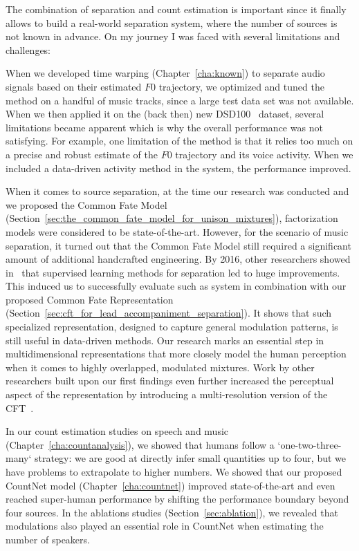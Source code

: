 The combination of separation and count estimation is important since it finally allows to build a real-world separation system, where the number of sources is not known in advance.
On my journey I was faced with several limitations and challenges:
\par
When we developed time warping (Chapter~\ref{cha:known}) to separate audio signals based on their estimated \(F0\) trajectory, we optimized and tuned the method on a handful of music tracks, since a large test data set was not available. When we then applied it on the (back then) new DSD100~\cite{liutkus17} dataset, several limitations became apparent which is why the overall performance was not satisfying. For example, one limitation of the method is that it relies too much on a precise and robust estimate of the \(F0\) trajectory and its voice activity. When we included a data-driven activity method in the system, the performance improved.
\par
When it comes to source separation, at the time our research was conducted and we proposed the Common Fate Model (Section~\ref{sec:the_common_fate_model_for_unison_mixtures}), factorization models were considered to be state-of-the-art.
However, for the scenario of music separation, it turned out that the Common Fate Model still required a significant amount of additional handcrafted engineering.
By 2016, other researchers showed in~\cite{uhlich15, nugraha162} that supervised learning methods for separation led to huge improvements. This induced us to successfully evaluate such as system in combination with our proposed Common Fate Representation (Section~\ref{sec:cft_for_lead_accompaniment_separation}).
It shows that such specialized representation, designed to capture general modulation patterns, is still useful in data-driven methods.
Our research marks an essential step in multidimensional representations that more closely model the human perception when it comes to highly overlapped, modulated mixtures. Work by other researchers built upon our first findings even further increased the perceptual aspect of the representation by introducing a multi-resolution version of the CFT~\cite{seetharaman17, pishdadian18}.
\par
In our count estimation studies on speech and music (Chapter~\ref{cha:countanalysis}), we showed that humans follow a `one-two-three-many` strategy: we are good at directly infer small quantities up to four, but we have problems to extrapolate to higher numbers.
We showed that our proposed CountNet model (Chapter~\ref{cha:countnet}) improved state-of-the-art and even reached super-human performance by shifting the performance boundary beyond four sources. In the ablations studies (Section~\ref{sec:ablation}), we revealed that modulations also played an essential role in CountNet when estimating the number of speakers.
